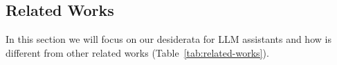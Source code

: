 \subsection{Related Works}
\label{sec:related_works}

In this section we will focus on our desiderata for LLM assistants and how \robotouille{} is different from other related works (Table~\ref{tab:related-works}).

% 

